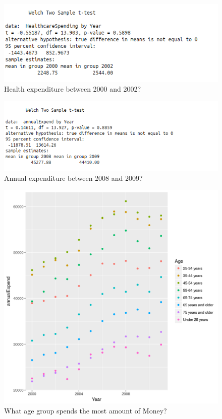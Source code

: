 \documentclass[11pt]{article}
\begin{document}
\begin{figure}[h]
\caption{Health expenditure between 2000 and 2002?}
\centering
\includegraphics[widt=\textwidth]{Ttest1.png}
\end{figure}

\begin{figure}[h]
\caption{Annual expenditure between 2008 and 2009?}
\centering
\includegraphics[widt=\textwidth]{Ttest2.png}
\end{figure}

\begin{figure}[h]
\caption{What age group spends the most amount of Money?}
\centering
\includegraphics[widt=\textwidth]{quest5.png}
\end{figure}
\end{document}
